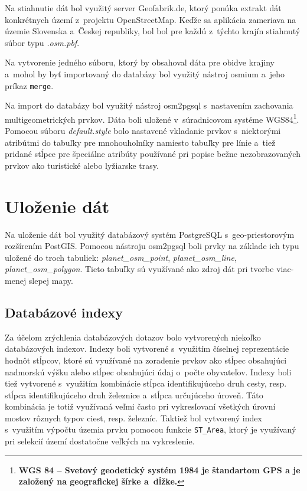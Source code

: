 Na stiahnutie dát bol využitý server Geofabrik.de, ktorý ponúka extrakt dát konkrétnych území z~projektu OpenStreetMap. Keďže sa aplikácia zameriava na územie Slovenska a~Českej republiky, bol bol pre každú z~týchto krajín stiahnutý súbor typu {\it .osm.pbf}.

Na vytvorenie jedného súboru, ktorý by obsahoval dáta pre obidve krajiny a~mohol by byť importovaný do databázy bol využitý nástroj osmium a~jeho príkaz {\tt merge}.

Na import do databázy bol využitý nástroj osm2pgsql s~nastavením zachovania multigeometrických prvkov. Dáta boli uložené v~súradnicovom systéme WGS84\footnote{\bf WGS 84 \rm -- Svetový geodetický systém 1984 je štandartom GPS a je založený na geografickej šírke a~dĺžke.}. Pomocou súboru  {\it default.style} bolo nastavené vkladanie prvkov s~niektorými atribútmi do tabuľky pre mnohouholníky namiesto tabuľky pre línie a~tiež pridané stĺpce pre špeciálne atribúty používané pri popise bežne nezobrazovaných prvkov ako turistické alebo lyžiarske trasy.

\section{Uloženie dát}
Na uloženie dát bol využitý databázový systém PostgreSQL s~geo-priestorovým rozšírením PostGIS. Pomocou nástroju osm2pgsql boli prvky na základe ich typu uložené do troch tabuliek: {\it planet\_osm\_point}, {\it planet\_osm\_line}, {\it planet\_osm\_polygon}. Tieto tabuľky sú využívané ako zdroj dát pri tvorbe viac-menej slepej mapy.

\subsection*{Databázové indexy}
\label{indexes}
Za účelom zrýchlenia databázových dotazov bolo vytvorených niekoľko databázových indexov. Indexy boli
vytvorené s~využitím číselnej reprezentácie hodnôt stĺpcov, ktoré sú využívané na zoradenie prvkov ako stĺpec obsahujúci nadmorskú výšku alebo stĺpec obsahujúci údaj o~počte obyvateľov. Indexy boli tiež vytvorené s~využitím kombinácie stĺpca identifikujúceho druh cesty, resp. stĺpca identifikujúceho druh železnice a~stĺpca určujúceho úroveň. Táto kombinácia je totiž využívaná veľmi často pri vykresľovaní všetkých úrovní mostov rôznych typov ciest, resp. železníc. Taktiež bol vytvorený index s~využitím výpočtu územia prvku pomocou funkcie {\tt ST\_Area}, ktorý je využívaný pri selekcií území dostatočne veľkých na vykreslenie.

